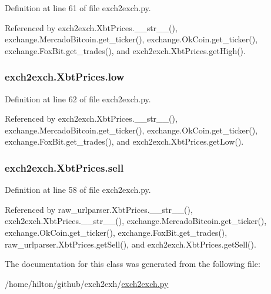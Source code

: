 Definition at line 61 of file exch2exch.\-py.



Referenced by exch2exch.\-Xbt\-Prices.\-\_\-\-\_\-str\-\_\-\-\_\-(), exchange.\-Mercado\-Bitcoin.\-get\-\_\-ticker(), exchange.\-Ok\-Coin.\-get\-\_\-ticker(), exchange.\-Fox\-Bit.\-get\-\_\-trades(), and exch2exch.\-Xbt\-Prices.\-get\-High().

\hypertarget{classexch2exch_1_1_xbt_prices_a8cef13f833a894d4fc5b8296bb4906fa}{
\subsubsection[{low}]{\setlength{\rightskip}{0pt plus 5cm}exch2exch.\-Xbt\-Prices.\-low}}\label{classexch2exch_1_1_xbt_prices_a8cef13f833a894d4fc5b8296bb4906fa}


Definition at line 62 of file exch2exch.\-py.



Referenced by exch2exch.\-Xbt\-Prices.\-\_\-\-\_\-str\-\_\-\-\_\-(), exchange.\-Mercado\-Bitcoin.\-get\-\_\-ticker(), exchange.\-Ok\-Coin.\-get\-\_\-ticker(), exchange.\-Fox\-Bit.\-get\-\_\-trades(), and exch2exch.\-Xbt\-Prices.\-get\-Low().

\hypertarget{classexch2exch_1_1_xbt_prices_a06fd0cfb03d485af3364a0d86fbe5385}{
\subsubsection[{sell}]{\setlength{\rightskip}{0pt plus 5cm}exch2exch.\-Xbt\-Prices.\-sell}}\label{classexch2exch_1_1_xbt_prices_a06fd0cfb03d485af3364a0d86fbe5385}


Definition at line 58 of file exch2exch.\-py.



Referenced by raw\-\_\-urlparser.\-Xbt\-Prices.\-\_\-\-\_\-str\-\_\-\-\_\-(), exch2exch.\-Xbt\-Prices.\-\_\-\-\_\-str\-\_\-\-\_\-(), exchange.\-Mercado\-Bitcoin.\-get\-\_\-ticker(), exchange.\-Ok\-Coin.\-get\-\_\-ticker(), exchange.\-Fox\-Bit.\-get\-\_\-trades(), raw\-\_\-urlparser.\-Xbt\-Prices.\-get\-Sell(), and exch2exch.\-Xbt\-Prices.\-get\-Sell().



The documentation for this class was generated from the following file\-:\begin{DoxyCompactItemize}
\item 
/home/hilton/github/exch2exh/\hyperlink{exch2exch_8py}{exch2exch.\-py}\end{DoxyCompactItemize}
